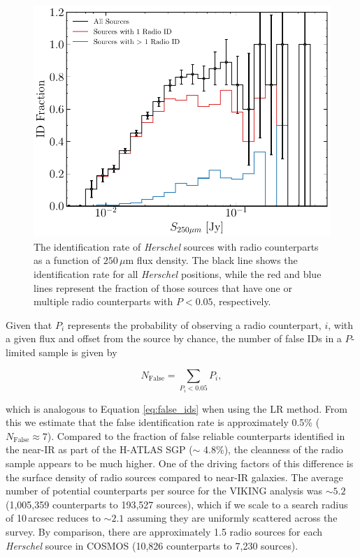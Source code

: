 \begin{figure}
	\centering
	\includegraphics[width=0.75\columnwidth]{Figures/id_fraction_radio.pdf}
	\caption{The identification rate of \textit{Herschel} sources with radio counterparts as a function of $250\,\mu$m flux density. The black line shows the identification rate for all \textit{Herschel} positions, while the red and blue lines represent the fraction of those sources that have one or multiple radio counterparts with $P < 0.05$, respectively.}
	\label{fig:id_rate}
\end{figure}

Given that $P_i$ represents the probability of observing a radio counterpart, $i$, with a given flux and offset from the source by chance, the number of false IDs in a $P$-limited sample is given by

\begin{equation}
    N_{\textrm{False}} = \sum_{P_i < 0.05} P_i,
    \label{eq:false_radio_ids}
\end{equation}

\noindent which is analogous to Equation \ref{eq:false_ids} when using the LR method. From this we estimate that the false identification rate is approximately 0.5\% ($N_\textrm{False} \approx 7$). Compared to the fraction of false reliable counterparts identified in the near-IR as part of the H-ATLAS SGP ($\sim$ 4.8\%), the cleanness of the radio sample appears to be much higher. One of the driving factors of this difference is the surface density of radio sources compared to near-IR galaxies. The average number of potential counterparts per source for the VIKING analysis was $\sim 5.2$ (1,005,359 counterparts to 193,527 sources), which if we scale to a search radius of 10\,arcsec reduces to $\sim 2.1$ assuming they are uniformly scattered across the survey. By comparison, there are approximately 1.5 radio sources for each \textit{Herschel} source in COSMOS (10,826 counterparts to 7,230 sources).

